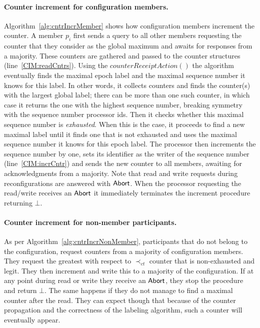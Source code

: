 \documentclass[11pt]{article}
\begin{document}
\paragraph{Counter increment for configuration members.} Algorithm~\ref{alg:cntrIncrMember} shows how configuration members increment the counter. 
A member $p_i$ first sends a query to all other members requesting the counter that they consider as the global maximum and awaits for responses from a majority.
These counters are gathered and passed to the counter structures (line~\ref{CIM:readCntrs}). 
Using the $counterReceiptAction()$ the algorithm eventually finds the maximal epoch label and the maximal sequence number it knows for this label. 
In other words, it collects counters and finds the counter(s) with the largest global label; there can be more than one such counter, in which case it returns the one with the highest sequence number, breaking symmetry with the sequence number processor ids. 
Then it checks whether this maximal sequence number is {\em exhausted}.
When this is the case, it proceeds to find a new maximal label  until it finds one that is not exhausted and uses the maximal sequence number it knows for this epoch label. 
The processor then increments the sequence number by one, sets its identifier as the writer of the sequence number (line~\ref{CIM:incrCntr}) and sends the new counter to all members, awaiting for acknowledgments from a majority.
Note that read and write requests during reconfigurations are answered with $\sf Abort$.
When the processor requesting the read/write receives an $\sf Abort$ it immediately terminates the increment procedure returning $\bot$.




\paragraph{Counter increment for non-member participants.} 
As per Algorithm~\ref{alg:cntrIncrNonMember}, participants that do not  belong to the configuration, request counters from a majority of configuration members.
They request the greatest with respect to $\prec_{ct}$ counter that is non-exhausted and legit. They then increment and write this to a majority of the configuration.
If at any point during read or write they receive an $\sf Abort$, they stop the procedure and return $\bot$.
The same happens if they do not manage to find a maximal counter after the read.
They can expect though that because of the counter propagation and the correctness of the labeling algorithm, such a counter will eventually appear.
\end{document}
